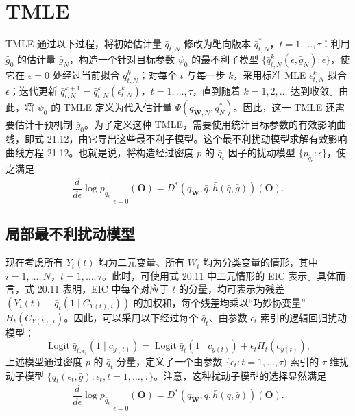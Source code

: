 \section{TMLE}

TMLE 通过以下过程，将初始估计量 $\bar q_{t,N}$ 修改为靶向版本 $\bar q^*_{t,N}$，$t=1,\ldots,\tau$：利用 $\bar g_0$ 的估计量 $\bar g_N$，构造一个针对目标参数 $\psi_0$ 的最不利子模型 $\{\bar q^k_{t,N}(\epsilon,\bar g_N):\epsilon\}$，使它在 $\epsilon=0$ 处经过当前拟合 $\bar q^k_{t,N}$；对每个 $t$ 与每一步 $k$，采用标准 MLE $\epsilon^k_{t,N}$ 拟合 $\epsilon$；迭代更新 $\bar q^{k+1}_{t,N}=\bar q^k_{t,N}(\epsilon^k_{t,N})$，$t=1,\ldots,\tau$，直到随着 $k=1,2,\ldots$ 达到收敛。由此，将 $\psi_0$ 的 TMLE 定义为代入估计量 $\Psi(q_{\mathbf W,N},\bar q_N^*)$。因此，这一 TMLE 还需要估计干预机制 $\bar g_0$。为了定义这种 TMLE，需要使用统计目标参数的有效影响曲线，即式 21.12，由它导出这些最不利子模型。这个最不利扰动模型求解有效影响曲线方程 21.12。也就是说，将构造经过密度 $p$ 的 $\bar q_t$ 因子的扰动模型 $\{p_{\bar q_\epsilon}:\epsilon\}$，使之满足
\begin{equation}
 \left.\frac d{d\epsilon}\log p_{\bar q_\epsilon}\right|_{\epsilon=0}(\mathbf O)
 =D^*(q_{\mathbf W},\bar q,\bar h(\bar q,\bar g))(\mathbf O).
 \tag{20.12}
\end{equation}

\subsection{局部最不利扰动模型}

现在考虑所有 $Y_i(t)$ 均为二元变量、所有 $W_i$ 均为分类变量的情形，其中 $i=1,\ldots,N$，$t=1,\ldots,\tau$。此时，可使用式 20.11 中二元情形的 EIC 表示。具体而言，式 20.11 表明，EIC 中每个对应于 $t$ 的分量，均可表示为残差 $(Y_i(t)-\bar q_t(1\mid C_{Y(t),i}))$ 的加权和，每个残差均乘以“巧妙协变量”$\bar H_t(C_{Y(t),i})$。因此，可以采用以下经过每个 $\bar q_t$、由参数 $\epsilon_t$ 索引的逻辑回归扰动模型：
\[
 \operatorname{Logit}\bar q_{t,\epsilon_t}(1\mid c_{y(t)})
 =\operatorname{Logit}\bar q_t(1\mid c_{y(t)})
       +\epsilon_t\bar H_t(c_{y(t)}),
\]
上述模型通过密度 $p$ 的 $\bar q_t$ 分量，定义了一个由参数 $\{\epsilon_t:t=1,\ldots,\tau)$ 索引的 $\tau$ 维扰动子模型 $\{\bar q_t(\epsilon_t,\bar g):\epsilon_t,t=1,\ldots,\tau\}$。注意，这种扰动子模型的选择显然满足
\[
 \left.\frac d{d\epsilon}\log p_{\bar q_\epsilon}\right|_{\epsilon=0}(\mathbf O)
 =D^*(q_{\mathbf W},\bar q,\bar h(\bar q,\bar g))(\mathbf O).
\]


